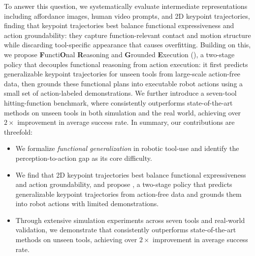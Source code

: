 To answer this question, we systematically evaluate intermediate representations 
including affordance images, human video prompts, and 2D keypoint trajectories, 
finding that keypoint trajectories best balance functional expressiveness and 
action groundability: they capture function-relevant contact and motion structure 
while discarding tool-specific appearance that causes overfitting. Building on 
this, we propose \textbf{F}uncti\textbf{O}nal \textbf{R}easoning and 
\textbf{G}rounded \textbf{E}xecution (\algoname{}), a two-stage policy that 
decouples functional reasoning from action execution: it first predicts 
generalizable keypoint trajectories for unseen tools from large-scale action-free 
data, then grounds these functional plans into executable robot actions using a 
small set of action-labeled demonstrations. We further introduce a seven-tool 
hitting-function benchmark, where \algoname{} consistently outperforms 
state-of-the-art methods on unseen tools in both simulation and the real world, 
achieving over $2\times$ improvement in average success rate. In summary, our 
contributions are threefold:
\begin{itemize}[leftmargin=*]
    \item We formalize \textit{functional generalization} in robotic tool-use 
    and identify the perception-to-action gap as its core difficulty.
    \item We find that 2D keypoint trajectories best balance functional 
    expressiveness and action groundability, and propose \algoname{}, a two-stage 
    policy that predicts generalizable keypoint trajectories from action-free data 
    and grounds them into robot actions with limited demonstrations.

    \item Through extensive simulation experiments across seven tools and real-world 
    validation, we demonstrate that \algoname{} consistently outperforms 
    state-of-the-art methods on unseen tools, achieving over $2\times$ improvement in average success rate.

\end{itemize}


